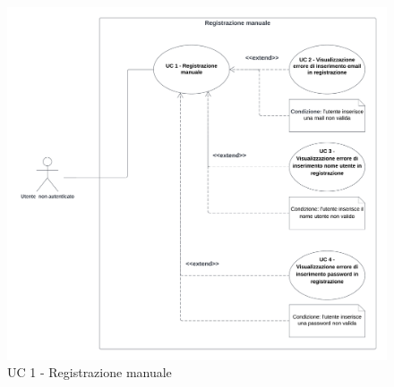 \begin{figure}[!h]
    \includegraphics[width=15cm]{sezioni/Images/UC1.png}
    \centering
    \caption{UC 1 - Registrazione manuale}
\end{figure}

